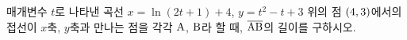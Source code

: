 매개변수 $t$로 나타낸 곡선 $x=\ln(2t+1)+4$, $y=t^2-t+3$ 위의 점 $(4{,}\mkern3mu\mathopen{}3)$에서의 접선이 $x$축, $y$축과 만나는 점을 각각 $\mathrm{A}$, $\mathrm{B}$라 할 때, $\overline{\mathrm{AB}}$의 길이를 구하시오.
